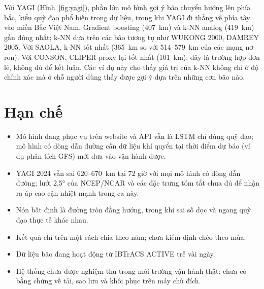 Với YAGI (Hình~\ref{fig:yagi}), phần lớn mô hình gợi ý bão chuyển hướng lên
phía bắc, kiểu quỹ đạo phổ biến trong dữ liệu, trong khi YAGI đi thẳng về phía
tây vào miền Bắc Việt Nam. Gradient boosting (407~km) và k-NN analog (419~km)
gần đúng nhất; k-NN dựa trên các bão tương tự như WUKONG 2000, DAMREY 2005. Với SAOLA, k-NN tốt nhất (365~km so với
514--579~km của các mạng nơ-ron). Với CONSON, CLIPER-proxy lại tốt nhất
(101~km); đây là trường hợp đơn lẻ, không đủ để kết luận. Các ví dụ này cho thấy
giá trị của k-NN không chỉ ở độ chính xác mà ở chỗ người dùng thấy được gợi ý
dựa trên những cơn bão nào.

\section{Hạn chế}

\begin{luuy}
\begin{itemize}[leftmargin=1.4em, itemsep=2pt]
  \item Mô hình đang phục vụ trên website và API vẫn là LSTM chỉ dùng quỹ đạo;
        mô hình có dòng dẫn đường cần dữ liệu khí quyển tại thời điểm dự báo
        (ví dụ phân tích GFS) mới đưa vào vận hành được.
  \item YAGI 2024 vẫn sai 620--670~km tại 72 giờ với mọi mô hình có dòng dẫn
        đường; lưới 2,5° của NCEP/NCAR và các đặc trưng tóm tắt chưa đủ để nhận
        ra áp cao cận nhiệt mạnh trong ca này.
  \item Nón bất định là đường tròn đẳng hướng, trong khi sai số dọc và ngang
        quỹ đạo thực tế khác nhau.
  \item Kết quả chỉ trên một cách chia theo năm; chưa kiểm định chéo theo mùa.
  \item Dữ liệu bão đang hoạt động từ IBTrACS ACTIVE trễ vài ngày.
  \item Hệ thống chưa được nghiệm thu trong môi trường vận hành thật: chưa có
        bằng chứng về tải, sao lưu và khôi phục trên máy chủ đích.
\end{itemize}
\end{luuy}
